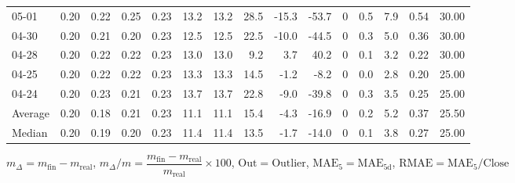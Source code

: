 \begin{threeparttable}
{\begin{tabular}{lrrrrrrrrrrrrrr}
  05-01 &          0.20 &          0.22 &          0.25 &        0.23 &                13.2 &               13.2 &                28.5 &      -15.3 &        -53.7 &              0 &                 0.5 &              7.9 &            0.54 &                  30.00 \\
  04-30 &          0.20 &          0.21 &          0.20 &        0.23 &                12.5 &               12.5 &                22.5 &      -10.0 &        -44.5 &              0 &                 0.3 &              5.0 &            0.36 &                  30.00 \\
  04-28 &          0.20 &          0.22 &          0.22 &        0.23 &                13.0 &               13.0 &                 9.2 &        3.7 &         40.2 &              0 &                 0.1 &              3.2 &            0.22 &                  30.00 \\
  04-25 &          0.20 &          0.22 &          0.22 &        0.23 &                13.3 &               13.3 &                14.5 &       -1.2 &         -8.2 &              0 &                 0.0 &              2.8 &            0.20 &                  25.00 \\
  04-24 &          0.20 &          0.23 &          0.21 &        0.23 &                13.7 &               13.7 &                22.8 &       -9.0 &        -39.8 &              0 &                 0.3 &              3.5 &            0.25 &                  25.00 \\
Average &          0.20 &          0.18 &          0.21 &        0.23 &                11.1 &               11.1 &                15.4 &       -4.3 &        -16.9 &              0 &                 0.2 &              5.2 &            0.37 &                  25.50 \\
 Median &          0.20 &          0.19 &          0.20 &        0.23 &                11.4 &               11.4 &                13.5 &       -1.7 &        -14.0 &              0 &                 0.1 &              3.8 &            0.27 &                  25.00 \\
\bottomrule
\end{tabular}
}
\begin{tablenotes}\footnotesize
\item $m_\Delta=m_{\text{fin}}-m_{\text{real}}$,
$m_\Delta/m=\dfrac{m_{\text{fin}}-m_{\text{real}}}{m_{\text{real}}}\times100$,
$\mathrm{Out}=\text{Outlier}$,
$\mathrm{MAE}_5=\mathrm{MAE}_{5\text{d}}$,
$\mathrm{RMAE}=\mathrm{MAE}_5/\text{Close}$
\end{tablenotes}
\end{threeparttable}
\endgroup

